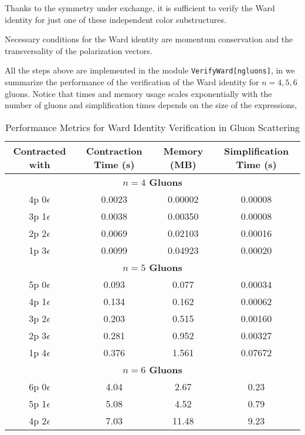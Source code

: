 \documentclass[main.tex]{subfiles}
\begin{document}
Thanks to the symmetry under exchange, it is sufficient to verify the Ward identity for just one of these independent color substructures.

Necessary conditions for the Ward identity are momentum conservation and the transversality of the polarization vectors.

All the steps above are implemented in the module \texttt{VerifyWard[ngluons]}, in  we summarize the performance of the verification of the Ward identity for $n=4,5,6$ gluons.
Notice that times and memory usage scales exponentially with the number of gluons and simplification times depends on the size of the expressions,

\begin{table}[htbp]
    \centering
    \caption{Performance Metrics for Ward Identity Verification in Gluon Scattering}
    \label{tab:ward-identity-verification}
    \begin{tabular}{|c|c|c|c|}
        \hline
        \textbf{Contracted  with} & \textbf{Contraction Time (s)} & \textbf{Memory (MB)} & \textbf{Simplification Time (s)} \\
        \hline
        \multicolumn{4}{|c|}{\textbf{$n=4$ Gluons}} \\
        \hline
        4p 0$\epsilon$ & 0.0023 & 0.00002 & 0.00008 \\
        3p 1$\epsilon$ & 0.0038 & 0.00350 & 0.00008 \\
        2p 2$\epsilon$ & 0.0069 & 0.02103 & 0.00016 \\
        1p 3$\epsilon$ & 0.0099 & 0.04923 & 0.00020 \\
        \hline
        \multicolumn{4}{|c|}{\textbf{$n=5$ Gluons}} \\
        \hline
        5p 0$\epsilon$ & 0.093 & 0.077 & 0.00034 \\ 
        4p 1$\epsilon$ & 0.134 & 0.162 & 0.00062 \\
        3p 2$\epsilon$ & 0.203 & 0.515 & 0.00160 \\
        2p 3$\epsilon$ & 0.281 & 0.952 & 0.00327 \\
        1p 4$\epsilon$ & 0.376 & 1.561 & 0.07672 \\
        \hline
        \multicolumn{4}{|c|}{\textbf{$n=6$ Gluons}} \\
        \hline
        6p 0$\epsilon$ & 4.04 & 2.67 & 0.23 \\
        5p 1$\epsilon$ & 5.08 & 4.52 & 0.79 \\
        4p 2$\epsilon$ & 7.03 & 11.48 & 9.23 \\

\end{tabular}
\end{table}
\end{document}
